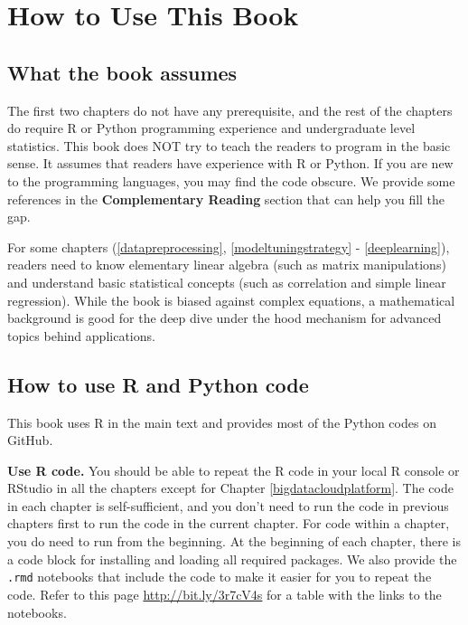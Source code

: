 \documentclass[12pt,]{krantz}
\begin{document}
\hypertarget{how-to-use-this-book}{%
\section*{How to Use This Book}\label{how-to-use-this-book}}


\hypertarget{what-the-book-assumes}{%
\subsection*{What the book assumes}\label{what-the-book-assumes}}


The first two chapters do not have any prerequisite, and the rest of the chapters do require R or Python programming experience and undergraduate level statistics. This book does NOT try to teach the readers to program in the basic sense. It assumes that readers have experience with R or Python.
If you are new to the programming languages, you may find the code obscure. We provide some references in the \textbf{Complementary Reading} section that can help you fill the gap.

For some chapters (\ref{datapreprocessing}, \ref{modeltuningstrategy} - \ref{deeplearning}), readers need to know elementary linear algebra (such as matrix manipulations) and understand basic statistical concepts (such as correlation and simple linear regression). While the book is biased against complex equations, a mathematical background is good for the deep dive under the hood mechanism for advanced topics behind applications.

\hypertarget{how-to-use-r-and-python-code}{%
\subsection*{How to use R and Python code}\label{how-to-use-r-and-python-code}}


This book uses R in the main text and provides most of the Python codes on GitHub.

\textbf{Use R code.} You should be able to repeat the R code in your local R console or RStudio in all the chapters except for Chapter \ref{bigdatacloudplatform}. The code in each chapter is self-sufficient, and you don't need to run the code in previous chapters first to run the code in the current chapter. For code within a chapter, you do need to run from the beginning. At the beginning of each chapter, there is a code block for installing and loading all required packages. We also provide the \texttt{.rmd} notebooks that include the code to make it easier for you to repeat the code. Refer to this page \url{http://bit.ly/3r7cV4s} for a table with the links to the notebooks.
\end{document}
